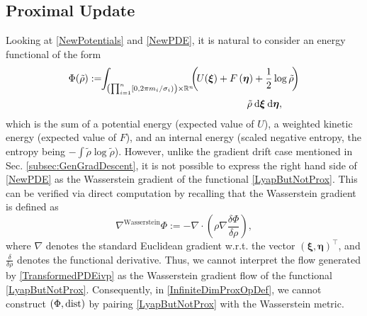\documentclass[10pt,twocolumn]{IEEEtran}
\newcommand{\differential}{{\rm{d}}}
\begin{document}
\subsection{Proximal Update}\label{subsec:ProxUpdate}
Looking at \eqref{NewPotentials} and \eqref{NewPDE}, it is natural to consider an energy functional of the form
\begin{align}
\Phi(\tilde{\rho}) &:= \!\!\displaystyle\int_{\left(\prod_{i=1}^{n}[0,2\pi m_{i}/\sigma_{i})\right)\times\mathbb{R}^{n}}\!\!\!\left(\!U(\bm{\xi})+ F\left(\bm{\eta}\right) + \frac{1}{2}\log\tilde{\rho}\!\right)\nonumber\\
&\qquad\qquad\qquad\qquad\qquad\qquad\qquad\qquad\tilde{\rho}\:\differential\bm{\xi}\:\differential\bm{\eta},
\label{LyapButNotProx}	
\end{align}
which is the sum of a potential energy (expected value of $U$), a weighted kinetic energy (expected value of $F$), and an internal energy (scaled negative entropy, the entropy being $-\int\tilde{\rho}\log\tilde{\rho}$). %
However, unlike the gradient drift case mentioned in Sec. \ref{subsec:GenGradDescent}, it is not possible to express the right hand side of \eqref{NewPDE} as the Wasserstein gradient of the functional \eqref{LyapButNotProx}. This can be verified via direct computation by recalling that the Wasserstein gradient is defined as \cite[Ch. 8]{ambrosio2008gradient} 
$$\nabla^{\text{Wasserstein}}\Phi := -\nabla\cdot\left(\rho\nabla\dfrac{\delta\Phi}{\delta\rho}\right),$$
where $\nabla$ denotes the standard Euclidean gradient w.r.t. the vector $(\bm{\xi},\bm{\eta})^{\top}$, and $\frac{\delta}{\delta\rho}$ denotes the functional derivative. %
Thus, 
we cannot interpret the flow generated by \eqref{TransformedPDEivp} as the Wasserstein gradient flow of the functional \eqref{LyapButNotProx}. Consequently, in \eqref{InfiniteDimProxOpDef}, we cannot construct $(\Phi,{\rm{dist}})$ by pairing \eqref{LyapButNotProx} with the Wasserstein metric.
\end{document}
